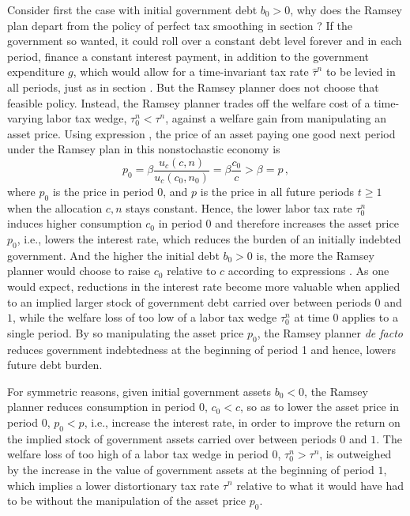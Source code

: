 Consider first the case with initial government debt $b_0>0$, why
does the Ramsey plan depart from the policy of perfect tax
smoothing in section ? If the government
so wanted, it could roll over a constant debt level forever and
in each period, finance a constant interest payment, in
addition to the government expenditure $g$, which would
allow for a time-invariant tax rate $\hat \tau^n$ to be levied
in all periods, just as in section . But the
Ramsey planner does not choose that feasible policy. Instead, the
Ramsey planner trades off the welfare cost of a time-varying labor
tax wedge, $\tau^n_0 < \tau^n$, against a welfare gain from
manipulating an asset price. Using expression , the
price of an asset paying one good next period under the Ramsey plan
in this nonstochastic economy is
$$
p_0=\beta {\frac{u_c(c,n)}{u_c(c_0,n_0)}} = \beta {\frac{c_0}{c}}
 > \beta = p\,,
$$
where $p_0$ is the price in period $0$, and $p$ is the price in
all future periods $t\geq 1$ when the allocation $c,n$ stays
constant. Hence, the lower labor tax rate $\tau^n_0$ induces
higher consumption $c_0$ in period $0$ and therefore increases
the asset price $p_0$, i.e., lowers the interest rate,
which reduces the burden of an initially indebted government.
And the higher the initial debt $b_0>0$ is, the more the Ramsey
planner would choose to raise $c_0$ relative to $c$ according to
expressions .
As one would expect, reductions in the interest rate become
more valuable when applied to an implied larger stock of government
debt carried over between periods $0$ and $1$, while the welfare
loss of too low of a labor tax wedge $\tau^n_0$ at time $0$ applies
to a single period. By so manipulating the asset price $p_0$, the
Ramsey planner {\it de facto} reduces government indebtedness at
the beginning of period 1 and hence, lowers future debt burden.

For symmetric reasons, given initial government assets $b_0<0$, the
Ramsey planner reduces consumption in period $0$,
$c_0 < c$, so as to lower the asset price in period $0$, $p_0<p$,
i.e., increase the interest rate, in order to improve the return on
the implied stock of government assets carried over between periods
$0$ and $1$. The welfare loss of too high of a labor tax wedge in
period $0$, $\tau^n_0 > \tau^n$, is outweighed by the increase in the
value of government assets at the beginning of period $1$, which
implies a lower distortionary tax rate $\tau^n$
relative to what it would have had to be without the manipulation
of the asset price $p_0$.


